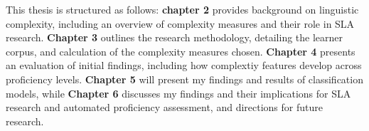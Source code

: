 This thesis is structured as follows: \textbf{chapter 2} provides background on linguistic complexity, including an
overview of complexity measures and their role in SLA research.
\textbf{Chapter 3} outlines the research methodology, detailing the learner corpus, and calculation of the complexity
measures chosen.
 \textbf{Chapter 4} presents an evaluation of initial findings, including how complextiy features develop across
proficiency levels.
\textbf{Chapter 5 }will present my findings and results of classification models, while \textbf{Chapter 6}
discusses my findings and their implications for SLA research and automated proficiency assessment, and directions for
future research.